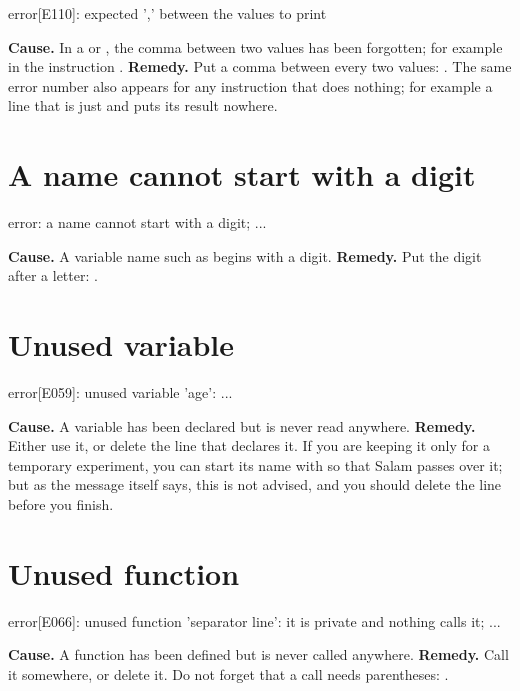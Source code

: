 \begin{plainout}
error[E110]: expected ',' between the values to print
\end{plainout}

\textbf{Cause.} In a  or , the comma between two
values has been forgotten; for example in the instruction
\mbox{}.
\textbf{Remedy.} Put a comma between every two values:
\mbox{}. The same error number also appears for
any instruction that does nothing; for example a line that is just
 and puts its result nowhere.

\section*{A name cannot start with a digit}

\begin{plainout}
error: a name cannot start with a digit; ...
\end{plainout}

\textbf{Cause.} A variable name such as  begins with a digit.
\textbf{Remedy.} Put the digit after a letter: .

\section*{Unused variable}

\begin{plainout}
error[E059]: unused variable 'age': ...
\end{plainout}

\textbf{Cause.} A variable has been declared but is never read anywhere.
\textbf{Remedy.} Either use it, or delete the line that declares it. If you
are keeping it only for a temporary experiment, you can start its name with
\code{\_} so that Salam passes over it; but as the message itself says, this
is not advised, and you should delete the line before you finish.

\section*{Unused function}

\begin{plainout}
error[E066]: unused function 'separator line': it is private and nothing calls it; ...
\end{plainout}

\textbf{Cause.} A function has been defined but is never called anywhere.
\textbf{Remedy.} Call it somewhere, or delete it. Do not forget that a call
needs parentheses: \mbox{}.

